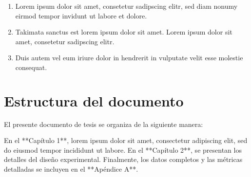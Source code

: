 \begin{enumerate}
    \item Lorem ipsum dolor sit amet, consetetur sadipscing elitr, sed diam nonumy eirmod tempor invidunt ut labore et dolore.
    \item Takimata sanctus est lorem ipsum dolor sit amet. Lorem ipsum dolor sit amet, consetetur sadipscing elitr.
    \item Duis autem vel eum iriure dolor in hendrerit in vulputate velit esse molestie consequat.
\end{enumerate}

\section{Estructura del documento}

El presente documento de tesis se organiza de la siguiente manera:

En el **Capítulo 1**, lorem ipsum dolor sit amet, consectetur adipiscing elit, sed do eiusmod tempor incididunt ut labore. En el **Capítulo 2**, se presentan los detalles del diseño experimental. Finalmente, los datos completos y las métricas detalladas se incluyen en el **Apéndice A**.
